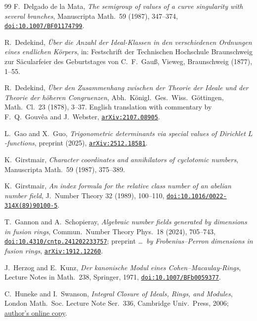 \documentclass[11pt,a4paper]{article}
\theoremstyle{definition}
\begin{document}
\begin{thebibliography}{99}
 F.~Delgado de la Mata, \emph{The semigroup of values of a curve singularity with several branches}, Manuscripta Math.~59 (1987), 347--374, \href{https://doi.org/10.1007/BF01174799}{\texttt{doi:10.1007/BF01174799}}.

 R.~Dedekind, \emph{\"Uber die Anzahl der Ideal-Klassen in den verschiedenen Ordnungen eines endlichen K\"orpers}, in: Festschrift der Technischen Hochschule Braunschweig zur S\"acularfeier des Geburtstages von C.~F.~Gau{\ss}, Vieweg, Braunschweig (1877), 1--55.

 R.~Dedekind, \emph{\"Uber den Zusammenhang zwischen der Theorie der Ideale und der Theorie der h\"oheren Congruenzen}, Abh.~K\"onigl.~Ges.~Wiss.~G\"ottingen, Math.~Cl.~23 (1878), 3--37. English translation with commentary by F.~Q.~Gouv\^ea and J.~Webster, \href{https://arxiv.org/abs/2107.08905}{\texttt{arXiv:2107.08905}}.

 L.~Gao and X.~Guo, \emph{Trigonometric determinants via special values of Dirichlet $L$-functions},
preprint (2025), \href{https://arxiv.org/abs/2512.18581}{\texttt{arXiv:2512.18581}}.

 K.~Girstmair, \emph{Character coordinates and annihilators of cyclotomic numbers}, Manuscripta
Math.~59 (1987), 375--389.

 K.~Girstmair, \emph{An index formula for the relative class number of an abelian number field}, J.~Number Theory 32 (1989), 100--110, \href{https://doi.org/10.1016/0022-314X(89)90100-5}{\texttt{doi:10.1016/0022-314X(89)90100-5}}.

 T.~Gannon and A.~Schopieray, \emph{Algebraic number fields generated by dimensions in fusion rings}, Commun.~Number Theory Phys.~18 (2024), 705--743, \href{https://doi.org/10.4310/cntp.241202233757}{\texttt{doi:10.4310/cntp.241202233757}}; preprint \emph{\dots\ by Frobenius--Perron dimensions in fusion rings}, \href{https://arxiv.org/abs/1912.12260}{\texttt{arXiv:1912.12260}}.

 J.~Herzog and E.~Kunz, \emph{Der kanonische Modul eines Cohen--Macaulay-Rings}, Lecture Notes in Math.~238, Springer, 1971, \href{https://doi.org/10.1007/BFb0059377}{\texttt{doi:10.1007/BFb0059377}}.

 C.~Huneke and I.~Swanson, \emph{Integral Closure of Ideals, Rings, and Modules}, London Math.~Soc. Lecture Note Ser.~336, Cambridge Univ.~Press, 2006; \href{https://www.math.purdue.edu/\%7Eiswanso/book/}{author's online copy}.


\end{thebibliography}
\end{document}
